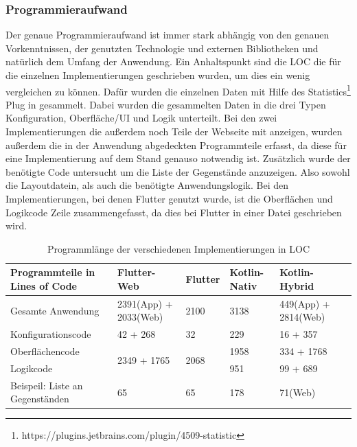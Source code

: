 \subsubsection{Programmieraufwand}
Der genaue Programmieraufwand ist immer stark abhängig von den genauen Vorkenntnissen, der genutzten Technologie und externen Bibliotheken und natürlich dem Umfang der Anwendung. Ein Anhaltspunkt sind die \ac{LOC} die für die einzelnen Implementierungen geschrieben wurden, um dies ein wenig vergleichen zu können. Dafür wurden die einzelnen Daten mit Hilfe des Statistics\footnote{https://plugins.jetbrains.com/plugin/4509-statistic} Plug in gesammelt. Dabei wurden die gesammelten Daten in die drei Typen Konfiguration, Oberfläche/UI und Logik unterteilt. Bei den zwei Implementierungen die außerdem noch Teile der Webseite mit anzeigen, wurden außerdem die in der Anwendung abgedeckten Programmteile erfasst, da diese für eine Implementierung auf dem Stand genauso notwendig ist. Zusätzlich wurde der benötigte Code untersucht um die Liste der Gegenstände anzuzeigen. Also sowohl die Layoutdatein, als auch die benötigte Anwendungslogik.
Bei den Implementierungen, bei denen Flutter genutzt wurde, ist die Oberflächen und Logikcode Zeile zusammengefasst, da dies bei Flutter in einer Datei geschrieben wird. 

\begin{table}
\centering
\caption{Programmlänge der verschiedenen Implementierungen in \ac{LOC}}
\begin{tabular}{ |p{4.5cm}||p{3cm}|p{2cm}|p{2cm}|p{3cm}|p{3cm}| }
 \hline
 Programmteile in Lines of Code & Flutter-Web & Flutter & Kotlin-Nativ & Kotlin-Hybrid \\
 \hline
 Gesamte Anwendung       &   2391(App) + 2033(Web) &   2100 & 3138 & 449(App) + 2814(Web)\\
  \hline
 Konfigurationscode  & 42 + 268& 32& 229& 16 + 357\\
  \hline
 Oberflächencode &\multirow{2}{*}{2349 + 1765}  &\multirow{2}{*}{2068}  & 1958& 334 + 1768\\
  \cline{1-1}
  \cline{4 -5}
 Logikcode & & & 951& 99 + 689\\
  \hline
 Beispeil: Liste an Gegenständen & 65 & 65 & 178 & 71(Web)\\
  \hline
\end{tabular}
\label{tab:lines_of_code}
\end{table}

